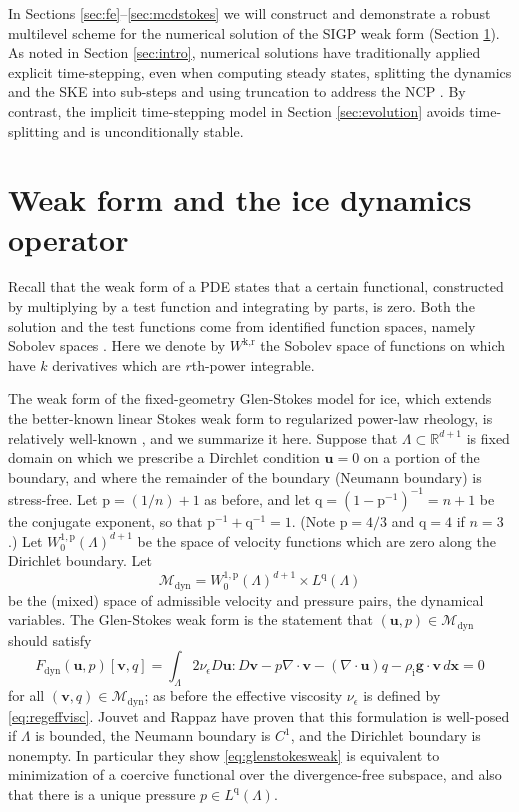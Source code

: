 \documentclass[letterpaper,final,12pt,reqno]{amsart}
\theoremstyle{claim}
\newcommand{\eps}{\epsilon}
\newcommand{\RR}{\mathbb{R}}
\newcommand{\Div}{\nabla\cdot}
\newcommand{\bg}{\mathbf{g}}
\newcommand{\bu}{\mathbf{u}}
\newcommand{\bv}{\mathbf{v}}
\newcommand{\bx}{\mathbf{x}}
\newcommand{\rhoi}{\rho_{\text{i}}}
\newcommand{\pp}{{\text{p}}}
\newcommand{\qq}{{\text{q}}}
\numberwithin{equation}{section}
\numberwithin{figure}{section}
\numberwithin{table}{section}
\numberwithin{theorem}{section}
\begin{document}
In Sections \ref{sec:fe}--\ref{sec:mcdstokes} we will construct and demonstrate a robust multilevel scheme for the numerical solution of the SIGP weak form (Section \ref{sec:weakido}).  As noted in Section \ref{sec:intro}, numerical solutions have traditionally applied explicit time-stepping, even when computing steady states, splitting the dynamics and the SKE into sub-steps and using truncation to address the NCP \cite[for example]{Jouvetetal2008,Lengetal2012}.  By contrast, the implicit time-stepping model in Section \ref{sec:evolution} avoids time-splitting and is unconditionally stable.


\section{Weak form and the ice dynamics operator} \label{sec:weakido}

Recall that the weak form of a PDE states that a certain functional, constructed by multiplying by a test function and integrating by parts, is zero.  Both the solution and the test functions come from identified function spaces, namely Sobolev spaces \cite{Evans2010}.  Here we denote by $W^{\text{k},\text{r}}$ the Sobolev space of functions on which have $k$ derivatives which are $r$th-power integrable.

The weak form of the fixed-geometry Glen-Stokes model for ice, which extends the better-known linear Stokes weak form \cite{Elmanetal2014} to regularized power-law rheology, is relatively well-known \cite{IsaacStadlerGhattas2015,JouvetRappaz2011,Lengetal2012}, and we summarize it here.  Suppose that $\Lambda \subset \RR^{d+1}$ is fixed domain on which we prescribe a Dirchlet condition $\bu=0$ on a portion of the boundary, and where the remainder of the boundary (Neumann boundary) is stress-free.  Let $\pp=(1/n)+1$ as before, and let $\qq=(1-\pp^{-1})^{-1}=n+1$ be the conjugate exponent, so that $\pp^{-1}+\qq^{-1}=1$. (Note $\pp=4/3$ and $\qq = 4$ if $n=3$.)  Let $W_0^{1,\pp}(\Lambda)^{d+1}$ be the space of velocity functions which are zero along the Dirichlet boundary.  Let
\begin{equation}
\mathcal{M}_{\text{dyn}} = W_0^{1,\pp}(\Lambda)^{d+1} \times L^\qq(\Lambda)  \label{eq:mixed}
\end{equation}
be the (mixed) space of admissible velocity and pressure pairs, the dynamical variables.  The Glen-Stokes weak form is the statement that $(\bu,p) \in \mathcal{M}_{\text{dyn}}$ should satisfy
\begin{equation}
F_{\text{dyn}}(\bu,p)[\bv,q] = \int_\Lambda 2 \nu_\eps D\bu : D\bv - p \Div\bv - (\Div\bu) q - \rhoi \bg \cdot \bv\,d\bx = 0 \label{eq:glenstokesweak}
\end{equation}
for all $(\bv,q) \in \mathcal{M}_{\text{dyn}}$; as before the effective viscosity $\nu_\eps$ is defined by \eqref{eq:regeffvisc}.  Jouvet and Rappaz \cite{JouvetRappaz2011} have proven that this formulation is well-posed if $\Lambda$ is bounded, the Neumann boundary is $C^1$, and the Dirichlet boundary is nonempty.  In particular they show \eqref{eq:glenstokesweak} is equivalent to minimization of a coercive functional over the divergence-free subspace, and also that there is a unique pressure $p\in L^\qq(\Lambda)$.
\end{document}
